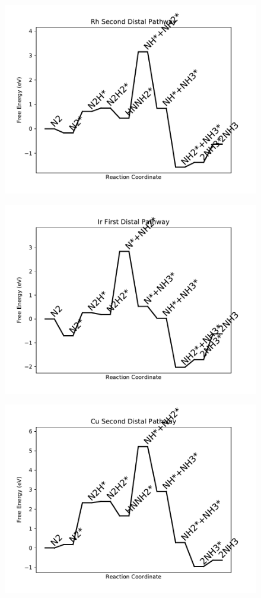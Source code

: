 \begin{figure}
\includegraphics[width=0.8\linewidth]{data/plots/Rh_distal_2.pdf}
\label{fig:Rh_distal_2}
\end{figure}

\begin{figure}
\includegraphics[width=0.8\linewidth]{data/plots/Ir_distal_1.pdf}
\label{fig:Ir_distal_1}
\end{figure}

\begin{figure}
\includegraphics[width=0.8\linewidth]{data/plots/Cu_distal_2.pdf}
\label{fig:Cu_distal_2}
\end{figure}

